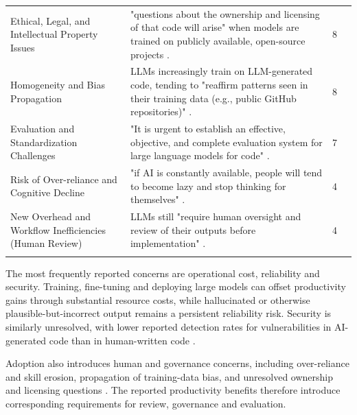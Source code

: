 {\begin{longtable}{>{\raggedright\arraybackslash} p{3cm} p{9.3cm} p{0.2cm} >{\raggedright\arraybackslash}p{1.8cm}}
Ethical, Legal, and Intellectual Property Issues & "questions about the ownership and licensing of that code will arise" when models are trained on publicly available, open-source projects \cite{Haque:2025la}. & 8 & \cite{Terragni:2025fa, AlHashimi:2025er, Zamfiroiu:2025ec, Ahmed:2025ai, Durrani:2024ad, Banh:2025cf, Basha:2025tt, Haque:2025la} \\ \addlinespace

Homogeneity and Bias Propagation & LLMs increasingly train on LLM-generated code, tending to "reaffirm patterns seen in their training data (e.g., public GitHub repositories)" \cite{Terragni:2025fa}. & 8 & \cite{Terragni:2025fa, Basha:2025tt, Haque:2025la, AlHashimi:2025er, Farhanna:2025eu, Banh:2025cf, Ahmed:2025ai, Ramos:2025aa} \\ \addlinespace

Evaluation and Standardization Challenges & "It is urgent to establish an effective, objective, and complete evaluation system for large language models for code" \cite{Ahmed:2025ai}. & 7 & \cite{Ahmed:2025ai, Yoo:2025sa, Hemmat:2025rd, Pendyala:2025pi, Farhanna:2025eu, Jabrw:2025ss, Han:2025mg} \\ \addlinespace

Risk of Over-reliance and Cognitive Decline & "if AI is constantly available, people will tend to become lazy and stop thinking for themselves" \cite{Banh:2025cf}. & 4 & \cite{Banh:2025cf, Basha:2025tt, Jensen:2025me, Zamfiroiu:2025ec} \\ \addlinespace

New Overhead and Workflow Inefficiencies (Human Review) & LLMs still "require human oversight and review of their outputs before implementation" \cite{Kim:2025ao}. & 4 & \cite{Kim:2025ao, Durrani:2024ad, Banh:2025cf, Zamfiroiu:2025ec} \\ \addlinespace

\end{longtable}
}

The most frequently reported concerns are operational cost, reliability and security. Training, fine-tuning and deploying large models can offset productivity gains through substantial resource costs, while hallucinated or otherwise plausible-but-incorrect output remains a persistent reliability risk. Security is similarly unresolved, with lower reported detection rates for vulnerabilities in AI-generated code than in human-written code \cite{Yoo:2025sa}.

Adoption also introduces human and governance concerns, including over-reliance and skill erosion, propagation of training-data bias, and unresolved ownership and licensing questions \cite{Haque:2025la, Terragni:2025fa}. The reported productivity benefits therefore introduce corresponding requirements for review, governance and evaluation.


